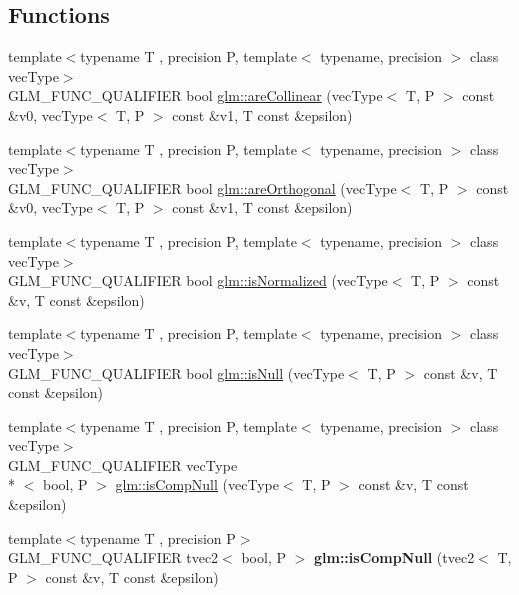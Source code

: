 \subsection*{Functions}
\begin{DoxyCompactItemize}
\item 
{\footnotesize template$<$typename T , precision P, template$<$ typename, precision $>$ class vec\-Type$>$ }\\G\-L\-M\-\_\-\-F\-U\-N\-C\-\_\-\-Q\-U\-A\-L\-I\-F\-I\-E\-R bool \hyperlink{group__gtx__vector__query_ga465b844190d1740051e45d780832ea4c}{glm\-::are\-Collinear} (vec\-Type$<$ T, P $>$ const \&v0, vec\-Type$<$ T, P $>$ const \&v1, T const \&epsilon)
\item 
{\footnotesize template$<$typename T , precision P, template$<$ typename, precision $>$ class vec\-Type$>$ }\\G\-L\-M\-\_\-\-F\-U\-N\-C\-\_\-\-Q\-U\-A\-L\-I\-F\-I\-E\-R bool \hyperlink{group__gtx__vector__query_gaee10acefed397c11e01f2862e837754c}{glm\-::are\-Orthogonal} (vec\-Type$<$ T, P $>$ const \&v0, vec\-Type$<$ T, P $>$ const \&v1, T const \&epsilon)
\item 
{\footnotesize template$<$typename T , precision P, template$<$ typename, precision $>$ class vec\-Type$>$ }\\G\-L\-M\-\_\-\-F\-U\-N\-C\-\_\-\-Q\-U\-A\-L\-I\-F\-I\-E\-R bool \hyperlink{group__gtx__vector__query_ga6fa5fa2af67d14c205d24c49aad03270}{glm\-::is\-Normalized} (vec\-Type$<$ T, P $>$ const \&v, T const \&epsilon)
\item 
{\footnotesize template$<$typename T , precision P, template$<$ typename, precision $>$ class vec\-Type$>$ }\\G\-L\-M\-\_\-\-F\-U\-N\-C\-\_\-\-Q\-U\-A\-L\-I\-F\-I\-E\-R bool \hyperlink{group__gtx__vector__query_ga81a64edc1a2b470b82896592e89c523b}{glm\-::is\-Null} (vec\-Type$<$ T, P $>$ const \&v, T const \&epsilon)
\item 
{\footnotesize template$<$typename T , precision P, template$<$ typename, precision $>$ class vec\-Type$>$ }\\G\-L\-M\-\_\-\-F\-U\-N\-C\-\_\-\-Q\-U\-A\-L\-I\-F\-I\-E\-R vec\-Type\\*
$<$ bool, P $>$ \hyperlink{group__gtx__vector__query_ga93ecd4137480483ce1af0de8bbbf6546}{glm\-::is\-Comp\-Null} (vec\-Type$<$ T, P $>$ const \&v, T const \&epsilon)
\item 
\hypertarget{namespaceglm_afc1ffd2beb09bb3c683b3606b2540519}{{\footnotesize template$<$typename T , precision P$>$ }\\G\-L\-M\-\_\-\-F\-U\-N\-C\-\_\-\-Q\-U\-A\-L\-I\-F\-I\-E\-R tvec2$<$ bool, P $>$ {\bfseries glm\-::is\-Comp\-Null} (tvec2$<$ T, P $>$ const \&v, T const \&epsilon)}\label{namespaceglm_afc1ffd2beb09bb3c683b3606b2540519}


\end{DoxyCompactItemize}
